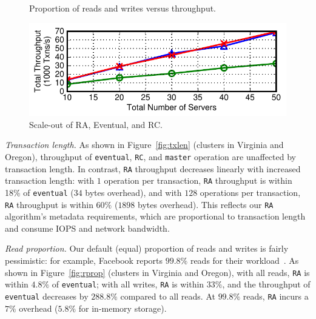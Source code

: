 \begin{figure}[t!]
\caption{Proportion of reads and writes versus throughput.}\vspace{-1em}
\label{fig:rprop}
\begin{center}
\includegraphics[width=\figfactor\columnwidth]{figs/finals/scaleout-thru.pdf}
\end{center}\vspace{-2.25em}
\caption{Scale-out of RA, Eventual, and RC.}\vspace{-1.5em}
\label{fig:scaleout}
\end{figure}

\vspace{.5em}\noindent\textit{Transaction length.} As shown in
Figure~\ref{fig:txlen} (clusters in Virginia and Oregon), throughput
of \texttt{eventual}, \texttt{RC}, and \texttt{master} operation are
unaffected by transaction length. In contrast, \texttt{RA} throughput
decreases linearly with increased transaction length: with $1$
operation per transaction, \texttt{RA} throughput is within 18\% of
\texttt{eventual} ($34$ bytes overhead), and with $128$ operations per
transaction, \texttt{RA} throughput is within $60\%$ ($1898$ bytes
overhead). This reflects our \texttt{RA} algorithm's metadata requirements,
which are proportional to transaction length and consume IOPS and
network bandwidth.


\vspace{.5em}\noindent\textit{Read proportion.} Our default (equal)
proportion of reads and writes is fairly pessimistic: for example,
Facebook reports $99.8\%$ reads for their workload~\cite{eiger}. As
shown in Figure~\ref{fig:rprop} (clusters in Virginia and Oregon),
with all reads, \texttt{RA} is within $4.8\%$ of \texttt{eventual};
with all writes, \texttt{RA} is within $33\%$, and the throughput of
\texttt{eventual} decreases by $288.8\%$ compared to all reads. At
$99.8\%$ reads, \texttt{RA} incurs a $7\%$ overhead ($5.8\%$ for in-memory
storage).




